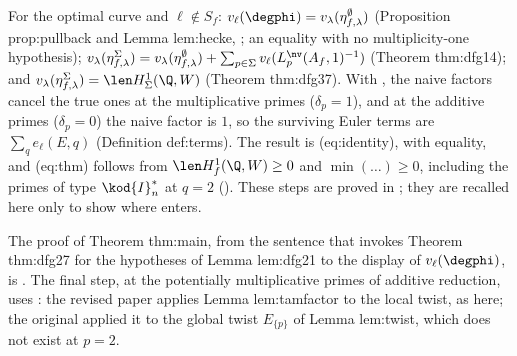 \begin{remark}\label{rem:blochkato:assembly}
For the optimal curve and $\ell\notin S_f$: $v_\ell(\degphi)=v_\lambda(\eta^\emptyset_{f,\lambda})$ (Proposition prop:pullback and Lemma lem:hecke, ; an equality with no
multiplicity-one hypothesis); $v_\lambda(\eta^\Sigma_{f,\lambda})=v_\lambda(\eta^\emptyset_{f,\lambda})+\sum_{p\in\Sigma}v_\ell(L^{\nv}_p(A_f,1)^{-1})$ (Theorem thm:dfg14); and $v_\lambda(\eta^\Sigma_{f,\lambda})=\len H^1_\Sigma(\Q,W)$
(Theorem thm:dfg37). With , the naive factors cancel the true ones at the multiplicative primes ($\delta_p=1$), and at the additive primes
($\delta_p=0$) the naive factor is $1$, so the surviving Euler terms are $\sum_qe_\ell(E,q)$ (Definition def:terms). The result is (eq:identity), with equality, and (eq:thm)
follows from $\len H^1_f(\Q,W)\ge0$ and $\min(\dots)\ge0$, including the primes of type $\kod{I}_n^*$ at $q=2$ (). These steps are proved in
; they are recalled here only to show where  enters.
\end{remark}

\begin{paperlink}
The proof of Theorem thm:main, from the sentence that invokes Theorem thm:dfg27 for the hypotheses of Lemma lem:dfg21 to the display of $v_\ell(\degphi)$, is . The final step, at the potentially multiplicative primes of additive
reduction, uses : the revised paper applies Lemma lem:tamfactor to the local twist, as here; the original applied it to the global twist
$E_{\{p\}}$ of Lemma lem:twist, which does not exist at $p=2$.
\end{paperlink}


